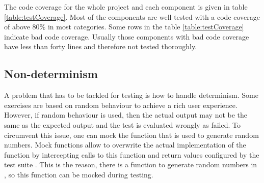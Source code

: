 The code coverage for the whole project and each component is given in table \ref{table:testCoverage}. Most of the components are well tested with a code coverage of above 80\% in most categories. Some rows in the table \ref{table:testCoverage} indicate bad code coverage. Usually those components with bad code coverage have less than forty lines and therefore not tested thoroughly. 
 
\subsection*{Non-determinism}
A problem that has to be tackled for testing is how to handle determinism. Some exercises are based on random behaviour to achieve a rich user experience. However, if random behaviour is used, then the actual output may not be the same as the expected output and the test is evaluated wrongly as failed. To circumvent this issue, one can mock the function that is used to generate random numbers. Mock functions allow to overwrite the actual implementation of the function by intercepting calls to this function and return values configured by the test suite \cite{Jest}. This is the reason, there is a function to generate random numbers in , so this function can be mocked during testing.

